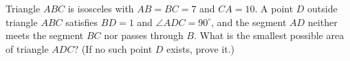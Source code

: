 Triangle $ABC$ is isosceles with $AB=BC=7$ and $CA=10$. A point $D$ outside triangle $ABC$ satisfies $BD=1$ and $\angle ADC=90^\circ$, and the segment $AD$ neither meets the segment $BC$ nor passes through $B$. What is the smallest possible area of triangle $ADC$? (If no such point $D$ exists, prove it.)
